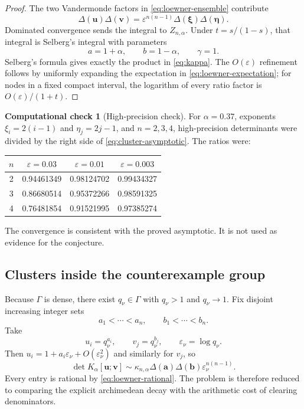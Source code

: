 \documentclass[11pt,oneside]{article}
\theoremstyle{definition}
\newtheorem{experiment}[theorem]{Computational check}
\theoremstyle{remark}
\newcommand{\eps}{\varepsilon}
\newcommand{\vander}{\Delta}
\begin{document}
\begin{proof}
The two Vandermonde factors in \eqref{eq:loewner-ensemble} contribute
\[
 \vander(\bm u)\vander(\bm v)
 =\eps^{n(n-1)}\vander(\bm\xi)\vander(\bm\eta).
\]
Dominated convergence sends the integral to $Z_{n,\alpha}$.  Under $t=s/(1-s)$, that integral is Selberg's integral with parameters
\[
 a=1+\alpha,
 \qquad b=1-\alpha,
 \qquad \gamma=1.
\]
Selberg's formula gives exactly the product in \eqref{eq:kappa}.  The $O(\eps)$ refinement follows by uniformly expanding the expectation in \eqref{eq:loewner-expectation}; for nodes in a fixed compact interval, the logarithm of every ratio factor is $O(\eps)/(1+t)$.
\end{proof}

\begin{experiment}[High-precision check]
For $\alpha=0.37$, exponents $\xi_i=2(i-1)$ and $\eta_j=2j-1$, and $n=2,3,4$, high-precision determinants were divided by the right side of \eqref{eq:cluster-asymptotic}.  The ratios were:
\begin{center}
\begin{tabular}{c|ccc}
\toprule
$n$ & $\eps=0.03$ & $\eps=0.01$ & $\eps=0.003$\\
\midrule
2 & 0.94461349 & 0.98124702 & 0.99434327\\
3 & 0.86680514 & 0.95372266 & 0.98591325\\
4 & 0.76481854 & 0.91521995 & 0.97385274\\
\bottomrule
\end{tabular}
\end{center}
The convergence is consistent with the proved asymptotic.  It is not used as evidence for the conjecture.
\end{experiment}

\subsection{Clusters inside the counterexample group}

Because $\Gamma$ is dense, there exist $q_\nu\in\Gamma$ with $q_\nu>1$ and $q_\nu\to1$.  Fix disjoint increasing integer sets
\[
 a_1<\cdots<a_n,
 \qquad b_1<\cdots<b_n.
\]
Take
\begin{equation}
 u_i=q_\nu^{a_i},
 \qquad v_j=q_\nu^{b_j},
 \qquad \eps_\nu=\log q_\nu.
 \label{eq:Gamma-cluster}
\end{equation}
Then $u_i=1+a_i\eps_\nu+O(\eps_\nu^2)$ and similarly for $v_j$, so
\begin{equation}
 \det K_\alpha[\bm u;\bm v]
 \sim\kappa_{n,\alpha}\vander(\bm a)\vander(\bm b)
 \eps_\nu^{n(n-1)}.
 \label{eq:Gamma-cluster-asymptotic}
\end{equation}
Every entry is rational by \eqref{eq:loewner-rational}.  The problem is therefore reduced to comparing the explicit archimedean decay with the arithmetic cost of clearing denominators.
\end{document}
